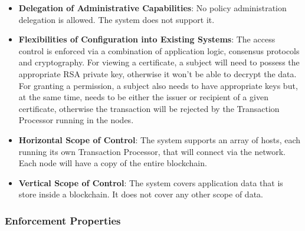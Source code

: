 \begin{itemize}
	\item \textbf{Delegation of Administrative Capabilities}: No policy administration delegation is allowed. The system does not support it.
	\item \textbf{Flexibilities of Configuration into Existing Systems}: The access control is enforced via a combination of application logic, consensus protocols and cryptography. For viewing a certificate, a subject will need to possess the appropriate RSA private key, otherwise it won't be able to decrypt the data. For granting a permission, a subject also needs to have appropriate keys but, at the same time, needs to be either the issuer or recipient of a given certificate, otherwise the transaction will be rejected by the Transaction Processor running in the nodes.
	\item \textbf{Horizontal Scope of Control}: The system supports an array of hosts, each running its own Transaction Processor, that will connect via the network. Each node will have a copy of the entire blockchain.
	\item \textbf{Vertical Scope of Control}: The system covers application data that is store inside a blockchain. It does not cover any other scope of data.
\end{itemize}

\subsubsection{Enforcement Properties}

